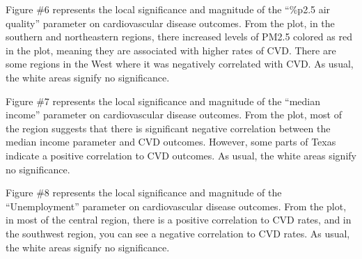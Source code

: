 \documentclass[
]{article}
\begin{document}
Figure \#6 represents the local significance and magnitude of the
``\%p2.5 air quality'' parameter on cardiovascular disease outcomes.
From the plot, in the southern and northeastern regions, there increased
levels of PM2.5 colored as red in the plot, meaning they are associated
with higher rates of CVD. There are some regions in the West where it
was negatively correlated with CVD. As usual, the white areas signify no
significance.

Figure \#7 represents the local significance and magnitude of the
``median income'' parameter on cardiovascular disease outcomes. From the
plot, most of the region suggests that there is significant negative
correlation between the median income parameter and CVD outcomes.
However, some parts of Texas indicate a positive correlation to CVD
outcomes. As usual, the white areas signify no significance.

Figure \#8 represents the local significance and magnitude of the
``Unemployment'' parameter on cardiovascular disease outcomes. From the
plot, in most of the central region, there is a positive correlation to
CVD rates, and in the southwest region, you can see a negative
correlation to CVD rates. As usual, the white areas signify no
significance.
\end{document}
